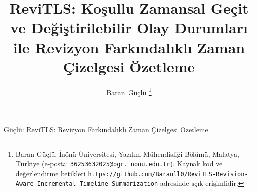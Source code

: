 ﻿\documentclass[journal]{IEEEtran}
\renewcommand{\abstractname}{\"{O}zet}
\renewcommand{\IEEEkeywordsname}{Anahtar Kelimeler}
\renewcommand{\figurename}{\c{S}ekil}
\renewcommand{\tablename}{Tablo}
\renewcommand{\refname}{Kaynak\c{c}a}
\renewcommand{\appendixname}{Ek}
\begin{document}
\renewcommand{\abstractname}{\"{O}zet}
\renewcommand{\IEEEkeywordsname}{Anahtar Kelimeler}
\renewcommand{\figurename}{\c{S}ekil}
\renewcommand{\tablename}{Tablo}
\renewcommand{\refname}{Kaynak\c{c}a}
\renewcommand{\appendixname}{Ek}

\title{ReviTLS: Ko\c{s}ullu Zamansal Ge\c{c}it ve De\u{g}i\c{s}tirilebilir Olay Durumlar{\i} ile Revizyon Fark{\i}ndal{\i}kl{\i} Zaman \c{C}izelgesi \"{O}zetleme}

\author{Baran~G\"{u}\c{c}l\"{u}%
\thanks{Baran G\"{u}\c{c}l\"{u}, \.{I}n\"{o}n\"{u} \"{U}niversitesi, Yaz{\i}l{\i}m M\"{u}hendisli\u{g}i B\"{o}l\"{u}m\"{u}, Malatya, T\"{u}rkiye (e-posta: \texttt{36253632025@ogr.inonu.edu.tr}). Kaynak kod ve de\u{g}erlendirme betikleri \texttt{https://github.com/Baranll0/ReviTLS-Revision-Aware-Incremental-Timeline-Summarization} adresinde a\c{c}{\i}k eri\c{s}imlidir.}}

%
{G\"{u}\c{c}l\"{u}: ReviTLS: Revizyon Fark{\i}ndal{\i}kl{\i} Zaman \c{C}izelgesi \"{O}zetleme}

\maketitle
\end{document}
